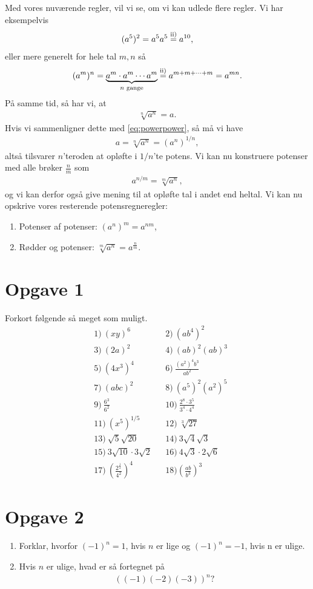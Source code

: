 Med vores nuværende regler, vil vi se, om vi kan udlede flere regler. Vi har eksempelvis
\begin{align*}
(a^5)^2 = a^5a^5 \overset{\textnormal{ii)}}{=} a^{10}, 
\end{align*}
eller mere generelt for hele tal $m,n$ så
\begin{align}\label{eq:powerpower}
(a^m)^n = \underbrace{a^m\cdot a^m\cdots a^m}_{n \textnormal{ gange}} \overset{\textnormal{ii)}}{=}  a^{m+m+\cdots+m} = a^{mn}.
\end{align}
På samme tid, så har vi, at 
\begin{align*}
\sqrt[n]{a^n} = a. 
\end{align*}
Hvis vi sammenligner dette med \eqref{eq:powerpower}, så må vi have
\begin{align*}
a = \sqrt[n]{a^n} = (a^n)^{1/n},
\end{align*}
altså tilsvarer $n$'teroden at opløfte i $1/n$'te potens. Vi kan nu konstruere potenser med alle brøker $\frac{n}{m}$ som
\begin{align*}
a^{n/m} = \sqrt[m]{a^n},
\end{align*}
og vi kan derfor også give mening til at opløfte tal i andet end heltal. 
Vi kan nu opskrive vores resterende potensregneregler:
\begin{enumerate}[label=\roman*)]
\item Potenser af potenser: $(a^n)^m = a^{nm}$,\\
\item Rødder og potenser: $\sqrt[m]{a^n} = a^{\frac{n}{m}}$.
\end{enumerate}

\section*{Opgave 1}
Forkort følgende så meget som muligt. 
\begin{align*}
&1)\ (xy)^6   &&2)\ (ab^4)^2     \\
&3)\ (2a)^2   &&4)\  (ab)^2(ab)^3    \\
&5)\  (4x^3)^4             &&6)\ \frac{(a^2)^4b^3}{ab^2}\\
 &7)\ (abc)^2      &&8)\ (a^5)^2(a^2)^5\\
 &9)\ \frac{6^3}{6^2} &&10)\ \frac{2^8\cdot 3^5}{3^4\cdot 4^4}\\
 &11)\  (x^5)^{1/5}            &&12)\ \sqrt[3]{27}\\
 &13)\ \sqrt{5}\sqrt{20}      &&14)\ 3\sqrt{4}\sqrt{3}\\
 &15)\ 3\sqrt{10}\cdot3\sqrt{2} &&16)\ 4\sqrt{3}\cdot2\sqrt{6} \\
&17)\ \left(\frac{2^\frac{1}{2}}{4^2}\right)^4  &&18) \left(\frac{ab}{b^3}\right)^3
\end{align*}

\section*{Opgave 2}
\begin{enumerate}[label=\roman*)]
	\item Forklar, hvorfor $(-1)^n = 1$, hvis $n$ er lige og  $(-1)^n=-1$, hvis n er ulige. 
	\item Hvis $n$ er ulige, hvad er så fortegnet på
	\begin{align*}
		((-1)(-2)(-3))^n?
	\end{align*}
\end{enumerate}
